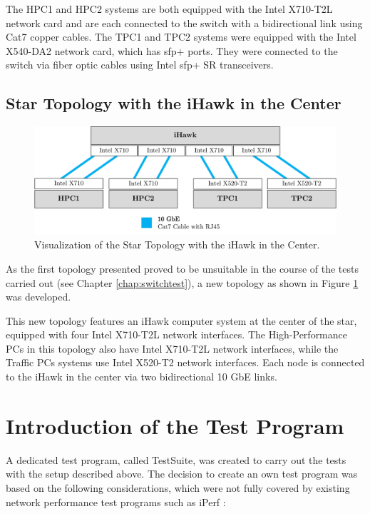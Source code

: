 The HPC1 and HPC2 systems are both equipped with the Intel X710-T2L network card and are each connected to the switch with a bidirectional link using Cat7 copper cables. The TPC1 and TPC2 systems were equipped with the Intel X540-DA2 network card, which has \ac{sfp}+ ports. They were connected to the switch via fiber optic cables using Intel \ac{sfp}+ SR transceivers.

\subsection{Star Topology with the iHawk in the Center} \label{chap:TopoiHawk}

\begin{figure}[ht!]
    \centering
    \includegraphics[width=1\linewidth]{figures/method/topo3.pdf}
    \caption[Visualization of the Star Topology with the iHawk in the Center]{Visualization of the Star Topology with the iHawk in the Center.}
    \label{fig:startopoIHawk}
\end{figure}

As the first topology presented proved to be unsuitable in the course of the tests carried out (see Chapter \ref{chap:switchtest}), a new topology as shown in Figure \ref{fig:startopoIHawk} was developed.

This new topology features an iHawk computer system at the center of the star, equipped with four Intel X710-T2L network interfaces. The High-Performance PCs in this topology also have Intel X710-T2L network interfaces, while the Traffic PCs systems use Intel X520-T2 network interfaces. Each node is connected to the iHawk in the center via two bidirectional 10 GbE links.

\clearpage
\section{Introduction of the Test Program} \label{chap:TestSuite}
A dedicated test program, called TestSuite, was created to carry out the tests with the setup described above. The decision to create an own test program was based on the following considerations, which were not fully covered by existing network performance test programs such as iPerf \cite{testsuite01}:

